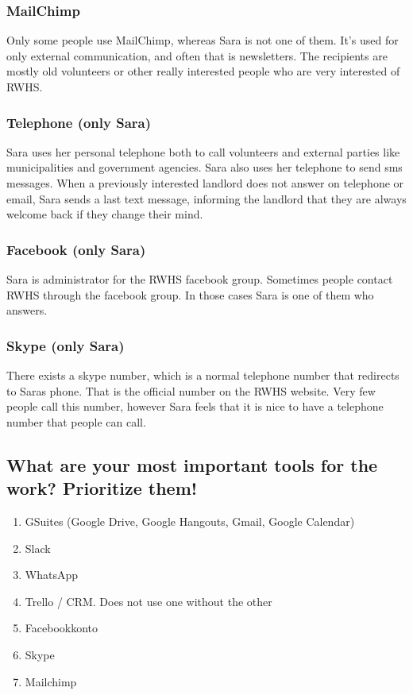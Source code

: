 \subsubsection{MailChimp}
Only some people use MailChimp, whereas Sara is not one of them. It’s used for only external communication, and often that is newsletters. The recipients are mostly old volunteers or other really interested people who are very interested of RWHS.

\subsubsection{Telephone (only Sara)}
Sara uses her personal telephone both to call volunteers and external parties like municipalities and government agencies. Sara also uses her telephone to send sms messages. When a previously interested landlord does not answer on telephone or email, Sara sends a last text message, informing the landlord that they are always welcome back if they change their mind.

\subsubsection{Facebook (only Sara)}
Sara is administrator for the RWHS facebook group. Sometimes people contact RWHS through the facebook group. In those cases Sara is one of them who answers.

\subsubsection{Skype (only Sara)}
There exists a skype number, which is a normal telephone number that redirects to Saras phone. That is the official number on the RWHS website. Very few people call this number, however Sara feels that it is nice to have a telephone number that people can call.

\subsection{What are your most important tools for the work? Prioritize them!}
\begin{enumerate}
\item GSuites (Google Drive, Google Hangouts, Gmail, Google Calendar)
\item Slack
\item WhatsApp
\item Trello / CRM. Does not use one without the other
\item Facebookkonto
\item Skype
\item Mailchimp
\end{enumerate}

